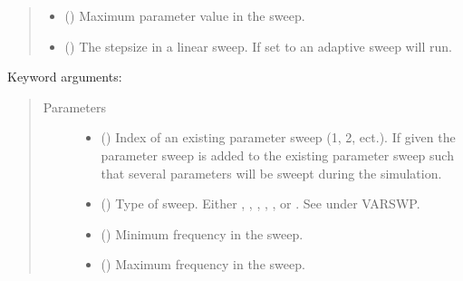 \documentclass[letterpaper,10pt,english,openany]{sphinxmanual}
\begin{document}
\begin{fulllineitems}
\begin{fulllineitems}
\begin{quote}
\begin{description}
\begin{itemize}
\item {} 
 () \textendash{} Maximum parameter value in the sweep.

\item {} 
 () \textendash{} The stepsize in a linear sweep. If set to  an adaptive sweep will run.

\end{itemize}

\end{description}\end{quote}

Keyword arguments:
\begin{quote}\begin{description}
\item[{Parameters}] \leavevmode\begin{itemize}
\item {} 
 () \textendash{} Index of an existing parameter sweep (1, 2, ect.). If given the parameter sweep is added to the existing parameter sweep such that several parameters will be sweept during the simulation.

\item {} 
 () \textendash{} Type of sweep. Either , , , , , or . See \label{\detokenize{source/sonpy:id29}}{\hyperref[\detokenize{source/users_guide:son15}]{\sphinxcrossref{{[}Son15{]}}}} under VARSWP.

\item {} 
 () \textendash{} Minimum frequency in the sweep.

\item {} 
 () \textendash{} Maximum frequency in the sweep.


\end{itemize}
\end{description}
\end{quote}
\end{fulllineitems}
\end{fulllineitems}
\end{document}
